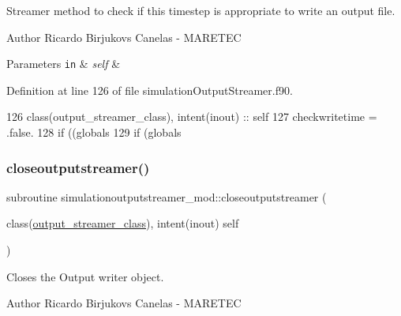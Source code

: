 Streamer method to check if this timestep is appropriate to write an output file. 

\begin{DoxyAuthor}{Author}
Ricardo Birjukovs Canelas -\/ M\+A\+R\+E\+T\+EC 
\end{DoxyAuthor}

\begin{DoxyParams}[1]{Parameters}
\mbox{\tt in}  & {\em self} & \\
\hline
\end{DoxyParams}


Definition at line 126 of file simulation\+Output\+Streamer.\+f90.


\begin{DoxyCode}
126     \textcolor{keywordtype}{class}(output\_streamer\_class), \textcolor{keywordtype}{intent(inout)} :: self
127     checkwritetime = .false.
128     \textcolor{keywordflow}{if} ((globals%
129     \textcolor{keywordflow}{if} (globals%
\end{DoxyCode}
\mbox{\label{namespacesimulationoutputstreamer__mod_adc0f21d337c283eee1f5f13b2eb51d52}} 
\subsubsection{\texorpdfstring{closeoutputstreamer()}{closeoutputstreamer()}}
{\footnotesize\ttfamily subroutine simulationoutputstreamer\+\_\+mod\+::closeoutputstreamer (\begin{DoxyParamCaption}\item[{class(\mbox{\hyperlink{structsimulationoutputstreamer__mod_1_1output__streamer__class}{output\+\_\+streamer\+\_\+class}}), intent(inout)}]{self }\end{DoxyParamCaption})\hspace{0.3cm}{\ttfamily [private]}}



Closes the Output writer object. 

\begin{DoxyAuthor}{Author}
Ricardo Birjukovs Canelas -\/ M\+A\+R\+E\+T\+EC 
\end{DoxyAuthor}


